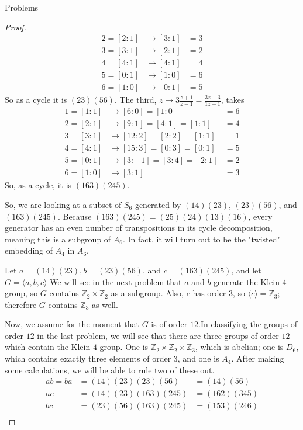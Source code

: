 \documentclass[12pt]{article}
\newcommand{\Z}{\mathbb{Z}}
\theoremstyle{definition}
\newenvironment{problem}[2][Problem]{\begin{trivlist}
\item[\hskip \labelsep {\bfseries #1}\hskip \labelsep {\bfseries #2.}]}{\end{trivlist}}
\begin{document}
\begin{section}{Problems}
\begin{problem}{1}
\begin{proof}
\begin{align*}
			2 = [2:1] &\mapsto [3:1] &= 3\\
			3 = [3:1] &\mapsto [2:1] &= 2\\
			4 = [4:1] &\mapsto [4:1] &= 4\\
			5 = [0:1] &\mapsto [1:0] &= 6\\
			6 = [1:0] &\mapsto [0:1] &= 5
		\end{align*}
		So as a cycle it is $(23)(56)$. The third, $z \mapsto 3\frac{z + 1}{z - 1} = \frac{3z + 3}{1z - 1}$, takes
		\begin{align*}
			1 = [1:1] &\mapsto [6:0] = [1:0] &= 6\\
			2 = [2:1] &\mapsto [9:1] = [4:1] = [1:1] &= 4\\
			3 = [3:1] &\mapsto [12:2] = [2:2] = [1:1] &= 1\\
			4 = [4:1] &\mapsto [15:3] = [0:3] = [0:1] &= 5\\
			5 = [0:1] &\mapsto [3:-1]  = [3:4] = [2:1] &= 2 \\
			6 = [1:0] &\mapsto [3:1]  &= 3
		\end{align*}
		So, as a cycle, it is $(163)(245)$.  
		\par So, we are looking at a subset of $S_6$ generated by $(14)(23)$, $(23)(56)$, and $(163)(245)$. Because $(163)(245) = (25)(24)(13)(16)$, every generator has an even number of transpositions in its cycle decomposition, meaning this is a subgroup of $A_6$. In fact, it will turn out to be the "twisted" embedding of $A_4$ in $A_6$. 
		\par Let $a = (14)(23), b = (23)(56)$, and $c = (163)(245)$, and let $G = \langle a, b, c\rangle$ We will see in the next problem that $a$ and $b$ generate the Klein $4$-group, so $G$ contains $\Z_2 \times \Z_2$ as a subgroup. Also, $c$ has order $3$, so $\langle c \rangle = \Z_3$; therefore $G$ contains $\Z_3$ as well. 
		\par Now, we assume for the moment that $G$ is of order $12$.In classifying the groups of order $12$ in the last problem, we will see that there are three groups of order $12$ which contain the Klein $4$-group. One is $\Z_2 \times \Z_2 \times \Z_3$, which is abelian; one is $D_6$, which contains exactly three elements of order $3$, and one is $A_4$. After making some calculations, we will be able to rule two of these out.
		\begin{align*}
		    ab = ba &= (14)(23)(23)(56) &= (14)(56)\\
		    ac &= (14)(23)(163)(245) &= (162)(345)\\
		    bc &= (23)(56)(163)(245) &= (153)(246)\\

\end{align*}
\end{proof}
\end{problem}
\end{section}
\end{document}
